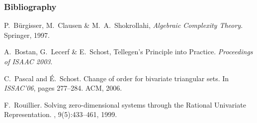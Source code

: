 \documentclass[10pt]{beamer}
\begin{document}
\begin{frame}
  \frametitle{Bibliography}

  \begin{thebibliography}{1}
  
  P.~Bürgisser, M.~Clausen \& M.~A.~Shokrollahi,
    \newblock \emph{Algebraic Complexity Theory}.
    \newblock Springer, 1997.
    
  A.~Bostan, G.~Lecerf \& E.~Schost,
    \newblock Tellegen's Principle into Practice.
    \newblock \emph{Proceedings of ISAAC 2003}.

    C.~Pascal and \'E.~Schost.
    \newblock Change of order for bivariate triangular sets.
    \newblock In \emph{ISSAC'06}, pages 277--284. ACM, 2006.

   F.~Rouillier.  \newblock Solving
    zero-dimensional systems through the {R}ational {U}nivariate
    {R}epresentation.  , 9(5):433--461, 1999.

  \end{thebibliography}
\end{frame}
\end{document}
